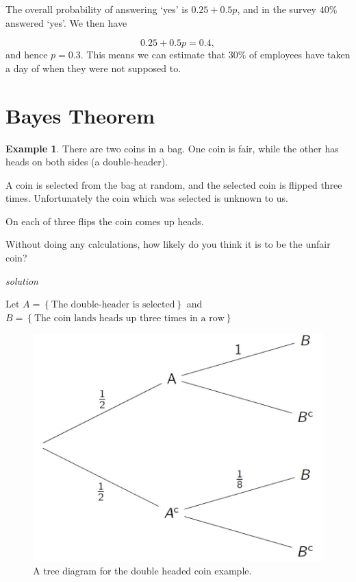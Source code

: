 \documentclass[
]{book}
\theoremstyle{definition}
\theoremstyle{definition}
\newtheorem{example}{Example}[chapter]
\theoremstyle{definition}
\theoremstyle{definition}
\theoremstyle{remark}
\begin{document}
The overall probability of answering `yes' is \(0.25+0.5p\), and in the survey \(40\%\) answered `yes'. We then have

\[0.25+0.5p = 0.4, \]
and hence \(p=0.3\). This means we can estimate that \(30\%\) of employees have taken a day of when they were not supposed to.

\hypertarget{bayes-theorem}{%
\section{Bayes Theorem}\label{bayes-theorem}}

\begin{example}
There are two coins in a bag. One coin is fair, while the other has heads on both sides (a double-header).

A coin is selected from the bag at random, and the selected coin is flipped three times. Unfortunately the coin which was selected is unknown to us.

On each of three flips the coin comes up heads.

Without doing any calculations, how likely do you think it is to be the unfair coin?
\end{example}

\emph{solution}

Let
\(A =\left\{ \text{The double-header is selected} \right\}\) and
\(B =\left\{ \text{The coin lands heads up three times in a row} \right\}\)

\begin{figure}

{\centering \includegraphics[width=12.38in]{./figures/doubleheader} 

}

\caption{A tree diagram for the double headed coin example.}\label{fig:tree4}
\end{figure}
\end{document}
